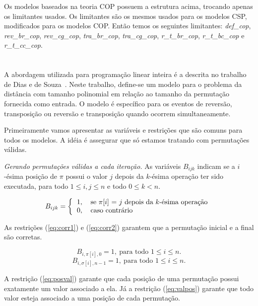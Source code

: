 Os modelos baseados na teoria COP possuem a estrutura acima, trocando
apenas os limitantes usados. Os limitantes são os mesmos usados para
os modelos CSP, modificados para os modelos COP. Então temos os
seguintes limitantes: \textit{def\_cop}, \textit{rev\_br\_cop},
\textit{rev\_cg\_cop}, \textit{tra\_br\_cop}, \textit{tra\_cg\_cop}, 
\textit{r\_t\_br\_cop}, \textit{r\_t\_bc\_cop}
e \textit{r\_t\_cc\_cop}.

\section{\PLI}
\label{sec:pli}
A abordagem utilizada para programação linear inteira é a descrita no
trabalho de Dias e de Souza~\cite{DiasSouza*2007}. Neste trabalho,
define-se um modelo para o problema da distância com tamanho
polinomial em relação ao tamanho da permutação fornecida como
entrada. O modelo é específico para os eventos de reversão,
transposição ou reversão e transposição quando ocorrem
simultaneamente.

Primeiramente vamos apresentar as variáveis e restrições que são
comuns para todos os modelos. A idéia é assegurar que só estamos
tratando com permutações válidas.

\textit{Gerando permutações válidas a cada iteração.} 
As variáveis $B_{ijk}$ indicam se a $i$-ésima posição de $\pi$ possui
o valor $j$ depois da $k$-ésima operação ter sido executada, para todo
$1 \le i, j \le n$ e todo $ 0 \le k < n$.

\[ 
B_{ijk} = \left \{ 
\begin{tabular}{ll} 
  1, & se $\pi[i]$ = $j$ depois da $k$-ésima operação \\ 
  0, & caso contrário
\end{tabular} 
\right .
\]

As restrições (\ref{eq:corr1}) e (\ref{eq:corr2}) garantem que a
permutação inicial e a final são corretas. 

\begin{equation} 
\label{eq:corr1} 
  B_{i,\pi[i],0} = 1,~\text{para todo $1 \le i \le n$}.
\end{equation}
\begin{equation} 
\label{eq:corr2}
  B_{i,\sigma[i],n-1} = 1,~\text{para todo $1 \le i \le n$}.
\end{equation}

A restrição (\ref{eq:posval}) garante que cada posição de uma
permutação possui exatamente um valor associado a ela. Já a restrição
(\ref{eq:valpos}) garante que todo valor esteja associado a uma
posição de cada permutação.

